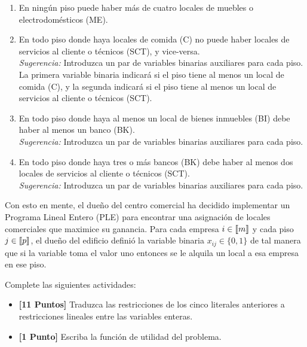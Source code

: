 \documentclass[ a4paper, twoside, 11pt]{article}
\begin{document}
\begin{problem}
\begin{enumerate}[label=\textbf{\alph*)}]
\item En ning\'un piso puede haber m\'as de cuatro locales de muebles o electrodom\'esticos (ME). 

\item En todo piso donde haya locales de comida (C) no puede haber locales de servicios al cliente o t\'ecnicos (SCT), y vice-versa. \\ \emph{Sugerencia:} Introduzca un par de variables binarias auxiliares para cada piso. La primera variable binaria indicar\'a si el piso tiene al menos un local de comida (C), y la segunda indicar\'a si el piso tiene al menos un local de servicios al cliente o t\'ecnicos (SCT). 

\item En todo piso donde haya al menos un local de bienes inmuebles (BI) debe haber al menos un banco (BK). \\ \emph{Sugerencia:} Introduzca un par de variables binarias auxiliares para cada piso. 

\item En todo piso donde haya tres o m\'as bancos (BK) debe haber al menos dos locales de servicios al cliente o t\'ecnicos (SCT). \\ \emph{Sugerencia:} Introduzca un par de variables binarias auxiliares para cada piso. 


\end{enumerate}

Con esto en mente, el due\~no del centro comercial ha decidido implementar un Programa Lineal Entero (PLE) para encontrar una asignaci\'on de locales comerciales que maximice su ganancia. Para cada empresa $i \in \llbracket m \rrbracket$ y cada piso $j \in \llbracket p \rrbracket$, el due\~no del edificio defini\'o la variable binaria $x_{ij} \in \{ 0, 1 \}$ de tal manera que si la variable toma el valor uno entonces se le alquila un local a esa empresa en ese piso. 

Complete las siguientes actividades: 
\begin{itemize}
\item \textbf{[11 Puntos]} Traduzca las restricciones de los cinco literales anteriores a restricciones lineales entre las variables enteras. 
\item \textbf{[1 Punto]} Escriba la funci\'on de utilidad del problema. 
\end{itemize}
\QED

\end{problem}
\fullskip
\end{document}
